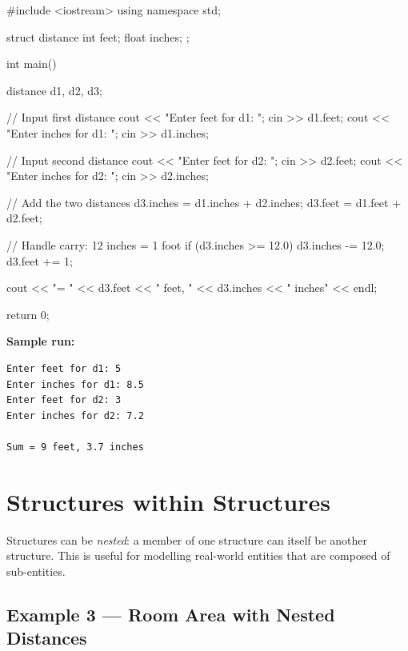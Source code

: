 \begin{cppcode}
#include <iostream>
using namespace std;

struct distance {
    int   feet;
    float inches;
};

int main() {
    distance d1, d2, d3;

    // Input first distance
    cout << "Enter feet for d1: ";   cin >> d1.feet;
    cout << "Enter inches for d1: "; cin >> d1.inches;

    // Input second distance
    cout << "Enter feet for d2: ";   cin >> d2.feet;
    cout << "Enter inches for d2: "; cin >> d2.inches;

    // Add the two distances
    d3.inches = d1.inches + d2.inches;
    d3.feet   = d1.feet   + d2.feet;

    // Handle carry: 12 inches = 1 foot
    if (d3.inches >= 12.0) {
        d3.inches -= 12.0;
        d3.feet   += 1;
    }

    cout << "\nSum = " << d3.feet << " feet, "
         << d3.inches << " inches" << endl;

    return 0;
}
\end{cppcode}

\noindent
\textbf{Sample run:}
\begin{verbatim}
Enter feet for d1: 5
Enter inches for d1: 8.5
Enter feet for d2: 3
Enter inches for d2: 7.2

Sum = 9 feet, 3.7 inches
\end{verbatim}

\section{Structures within Structures}
\label{sec:struct-nested}

Structures can be \emph{nested}: a member of one structure can itself
be another structure.  This is useful for modelling real-world entities
that are composed of sub-entities.

\subsection{Example 3 --- Room Area with Nested Distances}

